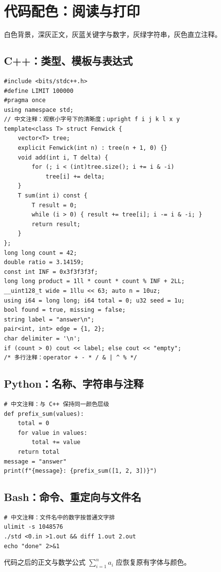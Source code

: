\section{代码配色：阅读与打印}
白色背景，深灰正文，灰蓝关键字与数字，灰绿字符串，灰色直立注释。
\subsection{C++：类型、模板与表达式}
\begin{verbatim}
#include <bits/stdc++.h>
#define LIMIT 100000
#pragma once
using namespace std;
// 中文注释：观察小字号下的清晰度；upright f i j k l x y
template<class T> struct Fenwick {
    vector<T> tree;
    explicit Fenwick(int n) : tree(n + 1, 0) {}
    void add(int i, T delta) {
        for (; i < (int)tree.size(); i += i & -i)
            tree[i] += delta;
    }
    T sum(int i) const {
        T result = 0;
        while (i > 0) { result += tree[i]; i -= i & -i; }
        return result;
    }
};
long long count = 42;
double ratio = 3.14159;
const int INF = 0x3f3f3f3f;
long long product = 1ll * count * count % INF + 2LL;
__uint128_t wide = 1llu << 63; auto n = 10uz;
using i64 = long long; i64 total = 0; u32 seed = 1u;
bool found = true, missing = false;
string label = "answer\n";
pair<int, int> edge = {1, 2};
char delimiter = '\n';
if (count > 0) cout << label; else cout << "empty";
/* 多行注释：operator + - * / & | ^ % */
\end{verbatim}
\subsection{Python：名称、字符串与注释}
\begin{verbatim}
# 中文注释：与 C++ 保持同一颜色层级
def prefix_sum(values):
    total = 0
    for value in values:
        total += value
    return total
message = "answer"
print(f"{message}: {prefix_sum([1, 2, 3])}")
\end{verbatim}
\subsection{Bash：命令、重定向与文件名}
\begin{verbatim}
# 中文注释：文件名中的数字按普通文字排
ulimit -s 1048576
./std <0.in >1.out && diff 1.out 2.out
echo "done" 2>&1
\end{verbatim}
代码之后的正文与数学公式 $\sum_{i=1}^{n} a_i$ 应恢复原有字体与颜色。
